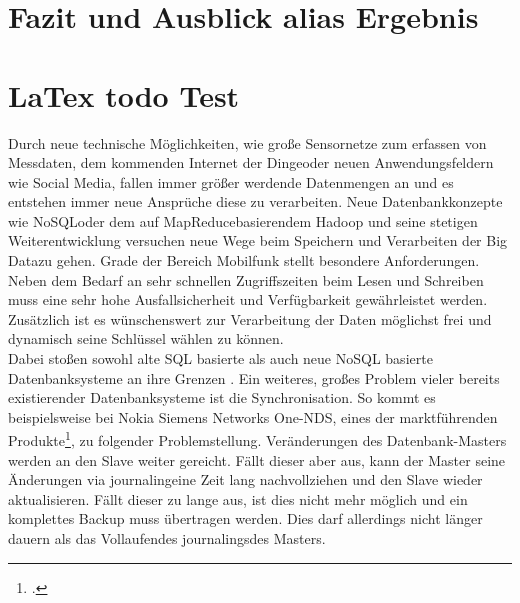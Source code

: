 \documentclass[a4paper,11pt,oneside,%
headsepline,												%
footsepline,												%
bibtotocnumbered									%
]{scrreprt}
\begin{document}
\chapter{Fazit und Ausblick alias Ergebnis}









\newpage
\chapter{LaTex todo Test}

Durch neue technische Möglichkeiten, wie große Sensornetze zum erfassen von Messdaten, dem kommenden \glqq Internet der Dinge\grqq  oder neuen Anwendungsfeldern wie \glqq Social Media\grqq , fallen immer größer werdende Datenmengen an und es entstehen immer neue Ansprüche diese zu verarbeiten. Neue Datenbankkonzepte  wie \glqq NoSQL\grqq  oder dem auf \glqq MapReduce\grqq basierendem Hadoop und seine stetigen Weiterentwicklung versuchen neue Wege beim Speichern und Verarbeiten der \glqq Big Data\grqq zu gehen. Grade der Bereich Mobilfunk stellt besondere Anforderungen. Neben dem Bedarf an sehr schnellen Zugriffszeiten beim Lesen und Schreiben muss eine sehr hohe Ausfallsicherheit und Verfügbarkeit gewährleistet werden. Zusätzlich ist es wünschenswert zur Verarbeitung der Daten möglichst frei und dynamisch seine Schlüssel wählen zu können.\\
Dabei stoßen sowohl alte SQL basierte als auch neue NoSQL basierte Datenbanksysteme an ihre Grenzen \autocite[preNote:siehe][Seite 1312:postNote]{Schlosser2011}.
Ein weiteres, großes Problem vieler bereits existierender Datenbanksysteme ist die Synchronisation\cite[preNote:siehe][Seite 1312:postNote]{Schlosser2011}. So kommt es beispielsweise bei  Nokia Siemens Networks \glqq One-NDS\grqq, eines der marktführenden Produkte\footcite[preNote:siehe][Seite 1312:postNote]{Schlosser2011}, zu folgender Problemstellung. Veränderungen des Datenbank-Masters werden an den Slave weiter gereicht. Fällt dieser aber aus, kann der Master seine Änderungen via \glqq journaling\grqq eine Zeit lang nachvollziehen und den Slave wieder aktualisieren. Fällt dieser zu lange aus, ist dies nicht mehr möglich und ein komplettes Backup muss übertragen werden. Dies darf allerdings nicht länger dauern als das \glqq Vollaufen\grqq des \glqq journalings\grqq des Masters.\\
\end{document}
